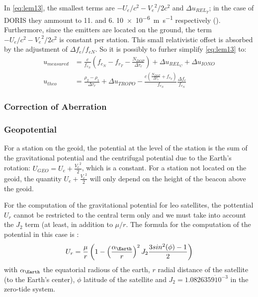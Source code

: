 In \ref{eq:lem13}, the smallest terms are \(-U_e / c^2 - {V_e}^2 / 2 c^2\) and 
\(\Delta u_{{REL}_T}\); in the case of DORIS they ammount to \num{11.} and 
\num{6.} \SI{10e-6}{\meter\per\second} respectively (\cite{lemoine-2016}). 
Furthermore, since the emitters are located on the ground, the term 
\(-U_e / c^2 - {V_e}^2 / 2 c^2\) is constant per station. This small 
relativistic offset is absorbed by the adjustment of \(\Delta f_e / f_{eN}\). 
So it is possibly to furher simplify \ref{eq:lem13} to:
\begin{subequations} \label{eq:lem17}
    \begin{align}
        u_{measured} & = \frac{c}{f_{e_N}} (f_{e_N} - f_{r_T} -
          \frac{N_{DOP}}{\Delta\tau_r}) + 
          \Delta u_{{REL}_C} + \Delta u_{IONO} \label{eq:lem17a}\\
        u_{theo} &= \frac{\rho_2 - \rho_1}{\Delta\tau_r} + \Delta u_{TROPO} - 
          \frac{c(\frac{N_{DOP}}{\Delta\tau_r} + f_{r_T})}{f_{e_N}} 
          \frac{\Delta f_e}{f_{e_N}} \label{eq:lem17b}
    \end{align}
\end{subequations}

\subsubsection{Correction of Aberration}

\subsubsection{Geopotential}
For a station on the geoid, the potential at the level of the station is the sum 
of the gravitational potential and the centrifugal potential due to the Earth's 
rotation: \(U_{GEO} = U_e + \frac{{V_e}^2}{2}\), which is a constant. For a station 
not located on the geoid, the quantity \(U_e + \frac{{V_e}^2}{2}\) will only depend 
on the height of the beacon above the geoid.

For the computation of the gravitational potential for \gls{leo} satellites, 
the pottential \(U_r\) cannot be restricted to the central term only and we must 
take into account the \(J_2\) term (at least, in addition to \(\mu / r\). The formula 
for the computation of the potential in this case is \cite{lemoine-2016}:
\begin{equation}
  \label{eq:lem18}
  U_r = \frac{\mu}{r} \left( 1- \left(\frac{\alpha_\Earth}{r}\right)^2 
    J_2 \frac{3 sin^2(\phi) - 1}{2} \right)
\end{equation}
with \(\alpha_\Earth\) the equatorial radious of the earth, \(r\) radial 
distance of the satellite (to the Earth's center), \(\phi\) latitude of the 
satellite and \(J_2 = 1.0826359 \dot 10^{-3}\) in the zero-tide system.

